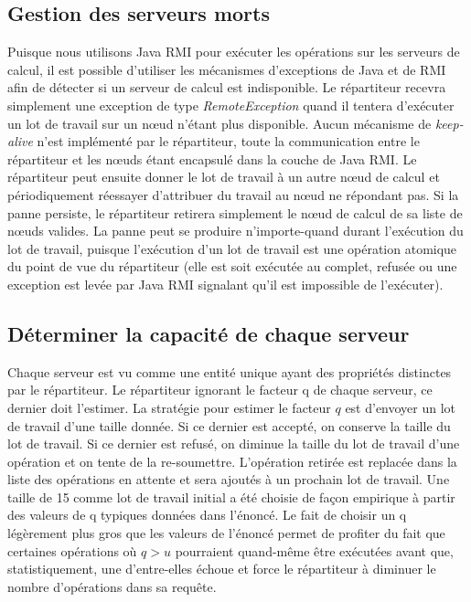 \subsection{Gestion des serveurs morts}
Puisque nous utilisons Java RMI pour exécuter les opérations sur les serveurs de calcul, il est possible d'utiliser les mécanismes d'exceptions de Java et 
de RMI afin de détecter si un serveur de calcul est indisponible. Le répartiteur recevra simplement une exception de type \emph{RemoteException}
quand il tentera d'exécuter un lot de travail sur un nœud n'étant plus disponible. Aucun mécanisme de \emph{keep-alive} n'est implémenté par le répartiteur, toute la communication 
entre le répartiteur et les nœuds étant encapsulé dans la couche de Java RMI. Le répartiteur peut ensuite donner le lot de travail à un autre nœud de calcul et périodiquement 
réessayer d'attribuer du travail au nœud ne répondant pas. Si la panne persiste, le répartiteur retirera simplement le nœud de calcul de sa liste de nœuds valides. La panne peut se
produire n'importe-quand durant l'exécution du lot de travail, puisque l'exécution d'un lot de travail est une opération atomique du point de vue du répartiteur (elle est soit exécutée au complet, 
refusée ou une exception est levée par Java RMI signalant qu'il est impossible de l'exécuter). 

\subsection{Déterminer la capacité de chaque serveur }
Chaque serveur est vu comme une entité unique ayant des propriétés distinctes par le répartiteur. Le répartiteur ignorant le facteur q de chaque
serveur, ce dernier doit l'estimer. La stratégie pour estimer le facteur $ q $ est d'envoyer un lot de travail d'une taille donnée. Si ce dernier est accepté, on 
conserve la taille du lot de travail. Si ce dernier est refusé, on diminue la taille du lot de travail d'une opération et on tente de la re-soumettre. L'opération 
retirée est replacée dans la liste des opérations en attente et sera ajoutés à un prochain lot de travail. Une taille de 15 comme lot de travail initial a été 
choisie de façon empirique à partir des valeurs de q typiques données dans l'énoncé. Le fait de choisir un q légèrement plus gros que les valeurs de l'énoncé permet
de profiter du fait que certaines opérations où $ q > u $ pourraient quand-même être exécutées avant que, statistiquement, une d'entre-elles échoue et force le 
répartiteur à diminuer le nombre d'opérations dans sa requête. 

